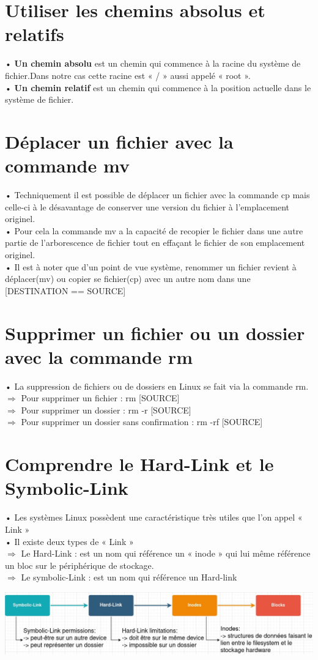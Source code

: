 \documentclass[a4paper, 11pt, french, oneside]{book}
\begin{document}
		\section{Utiliser les chemins absolus et relatifs} 
			• \textbf{Un chemin absolu} est un chemin qui commence à la racine du système de fichier.Dans notre cas cette racine est « / » aussi appelé « root ».\\
		
		    • \textbf{Un chemin relatif} est un chemin qui commence à la position actuelle dans le système de fichier.
		\section{Déplacer un fichier avec la commande mv}
			• Techniquement il est possible de déplacer un fichier avec la commande cp mais celle-ci à le désavantage de conserver une version du fichier à l’emplacement originel.\\
		    • Pour cela la commande mv a la capacité de recopier le fichier dans une autre partie de
		l’arborescence de fichier tout en effaçant le fichier de son emplacement originel.\\
		    • Il est à noter que d’un point de vue système, renommer un fichier revient à déplacer(mv) ou copier se fichier(cp) avec un autre nom dans une [DESTINATION == SOURCE]
		\section{Supprimer un fichier ou un dossier avec la commande rm}
			• La suppression de fichiers ou de dossiers en Linux se fait via la commande rm.\\
			$\Rightarrow$ Pour supprimer un fichier : rm [SOURCE]\\
			$\Rightarrow$ Pour supprimer un dossier : rm -r [SOURCE]\\
			$\Rightarrow$ Pour supprimer un dossier sans confirmation : rm -rf [SOURCE]
		\section{Comprendre le Hard-Link et le Symbolic-Link} 
			• Les systèmes Linux possèdent une caractéristique très utiles que l’on appel « Link »\\
		    • Il existe deux types de « Link »\\
			$\Rightarrow$ Le Hard-Link : est un nom qui référence un « inode » qui lui même référence un bloc sur le périphérique de stockage.\\
			$\Rightarrow$ Le symbolic-Link : est un nom qui référence un Hard-link
			\begin{flushleft}
				\includegraphics[scale=0.6]{link.jpg}
			\end{flushleft}
\end{document}
